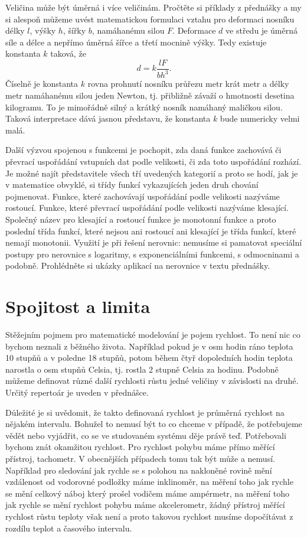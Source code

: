 \documentclass[12pt]{article}
\begin{document}
Veličina může být úměrná i více veličinám. Pročtěte si příklady z přednášky a my si alespoň můžeme uvést matematickou formulaci vztahu pro deformaci nosníku délky $l$, výšky $h$, šířky $b$, namáhanému silou $F$. Deformace $d$ ve středu je úměrná síle a délce a nepřímo úměrná šířce a třetí mocnině výšky. Tedy existuje konstanta $k$ taková, že $$d=k\frac {l F}{b h^3}.$$ Číselně je konstanta $k$ rovna prohnutí nosníku průřezu metr krát metr a délky metr namáhanému silou jeden Newton, tj. přibližně závaží o hmotnosti desetina kilogramu. To je mimořádně silný a krátký nosník namáhaný maličkou silou. Taková interpretace dává jasnou představu, že konstanta $k$ bude numericky velmi malá.

Další výzvou spojenou s funkcemi je pochopit, zda daná funkce zachovává či převrací uspořádání vstupních dat podle velikosti, či zda toto uspořádání rozhází. Je možné najít představitele všech tří uvedených kategorií a proto se hodí, jak je v matematice obvyklé, si třídy funkcí vykazujících jeden druh chování pojmenovat. Funkce, které zachovávají uspořádání podle velikosti nazýváme rostoucí. Funkce, které převrací uspořádání podle velikosti nazýváme klesající. Společný název pro klesající a rostoucí funkce je monotonní funkce a proto poslední třída funkcí, které nejsou ani rostoucí ani klesající je třída funkcí, které nemají monotonii. Využití je při řešení nerovnic: nemusíme si pamatovat speciální postupy pro nerovnice s logaritmy, s exponenciálními funkcemi, s odmocninami a podobně. Prohlédněte si ukázky aplikací na nerovnice v textu přednášky.

\newpage
\section*{Spojitost a limita}

Stěžejním pojmem pro matematické modelování je pojem rychlost. To není nic co bychom neznali z běžného života. Například pokud je v osm hodin ráno teplota 10 stupňů a v poledne 18 stupňů, potom během čtyř dopoledních hodin teplota narostla o osm stupňů Celsia, tj. rostla 2 stupně Celsia za hodinu. Podobně můžeme definovat různé další rychlosti růstu jedné veličiny v závislosti na druhé. Určitý repertoár je uveden v přednášce.

Důležité je si uvědomit, že takto definovaná rychlost je průměrná rychlost na nějakém intervalu. Bohužel to nemusí být to co chceme v případě, že potřebujeme vědět nebo vyjádřit, co se ve studovaném systému děje právě teď. Potřebovali bychom znát okamžitou rychlost. Pro rychlost pohybu máme přímo měřící přístroj, tachometr. V obecnějších případech tomu tak být může a nemusí. Například pro sledování jak rychle se s polohou na nakloněné rovině mění vzdálenost od vodorovné podložky máme inklinoměr, na měření toho jak rychle se mění celkový náboj který prošel vodičem máme ampérmetr, na měření toho jak rychle se mění rychlost pohybu máme akcelerometr, žádný přístroj měřící rychlost růstu teploty však není a proto takovou rychlost musíme dopočítávat z rozdílu teplot a časového intervalu.
\end{document}
